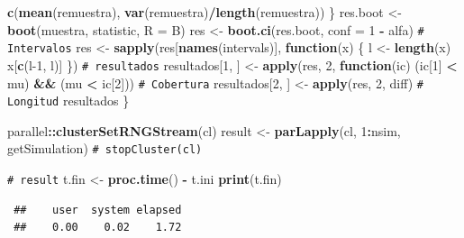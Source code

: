 \documentclass[
  spanish,
  10pt,
]{book}
\newenvironment{Shaded}{\begin{snugshade}}{\end{snugshade}}
\newcommand{\AttributeTok}[1]{\textcolor[rgb]{0.13,0.29,0.53}{#1}}
\newcommand{\CommentTok}[1]{\textcolor[rgb]{0.56,0.35,0.01}{\textit{#1}}}
\newcommand{\ControlFlowTok}[1]{\textcolor[rgb]{0.13,0.29,0.53}{\textbf{#1}}}
\newcommand{\DecValTok}[1]{\textcolor[rgb]{0.00,0.00,0.81}{#1}}
\newcommand{\FunctionTok}[1]{\textcolor[rgb]{0.13,0.29,0.53}{\textbf{#1}}}
\newcommand{\NormalTok}[1]{#1}
\newcommand{\OtherTok}[1]{\textcolor[rgb]{0.56,0.35,0.01}{#1}}
\newcommand{\SpecialCharTok}[1]{\textcolor[rgb]{0.81,0.36,0.00}{\textbf{#1}}}
\theoremstyle{break}
\theoremstyle{nonumberplain}
\renewcommand{\CommentTok}[1]{\textcolor[rgb]{0.41,0.41,0.41}{\texttt{#1}}}
\begin{document}
\begin{Shaded}
\begin{Highlighting}[]
      \FunctionTok{c}\NormalTok{(}\FunctionTok{mean}\NormalTok{(remuestra), }\FunctionTok{var}\NormalTok{(remuestra)}\SpecialCharTok{/}\FunctionTok{length}\NormalTok{(remuestra))}
\NormalTok{    \}}
\NormalTok{    res.boot }\OtherTok{\textless{}{-}} \FunctionTok{boot}\NormalTok{(muestra, statistic, }\AttributeTok{R =}\NormalTok{ B)}
\NormalTok{    res }\OtherTok{\textless{}{-}} \FunctionTok{boot.ci}\NormalTok{(res.boot, }\AttributeTok{conf =} \DecValTok{1} \SpecialCharTok{{-}}\NormalTok{ alfa)}
    \CommentTok{\# Intervalos}
\NormalTok{    res }\OtherTok{\textless{}{-}} \FunctionTok{sapply}\NormalTok{(res[}\FunctionTok{names}\NormalTok{(intervals)], }\ControlFlowTok{function}\NormalTok{(x) \{}
\NormalTok{      l }\OtherTok{\textless{}{-}} \FunctionTok{length}\NormalTok{(x)}
\NormalTok{      x[}\FunctionTok{c}\NormalTok{(l}\DecValTok{{-}1}\NormalTok{, l)]}
\NormalTok{    \})}
    \CommentTok{\# resultados}
\NormalTok{    resultados[}\DecValTok{1}\NormalTok{, ] }\OtherTok{\textless{}{-}} \FunctionTok{apply}\NormalTok{(res, }\DecValTok{2}\NormalTok{,}
                                   \ControlFlowTok{function}\NormalTok{(ic) (ic[}\DecValTok{1}\NormalTok{] }\SpecialCharTok{\textless{}}\NormalTok{ mu) }\SpecialCharTok{\&\&}\NormalTok{ (mu }\SpecialCharTok{\textless{}}\NormalTok{ ic[}\DecValTok{2}\NormalTok{])) }\CommentTok{\# Cobertura}
\NormalTok{    resultados[}\DecValTok{2}\NormalTok{, ] }\OtherTok{\textless{}{-}} \FunctionTok{apply}\NormalTok{(res, }\DecValTok{2}\NormalTok{, diff) }\CommentTok{\# Longitud}
\NormalTok{    resultados}
\NormalTok{\}}

\NormalTok{parallel}\SpecialCharTok{::}\FunctionTok{clusterSetRNGStream}\NormalTok{(cl)}
\NormalTok{result }\OtherTok{\textless{}{-}} \FunctionTok{parLapply}\NormalTok{(cl, }\DecValTok{1}\SpecialCharTok{:}\NormalTok{nsim, getSimulation)}
\CommentTok{\# stopCluster(cl)}

\CommentTok{\# result}
\NormalTok{t.fin }\OtherTok{\textless{}{-}} \FunctionTok{proc.time}\NormalTok{() }\SpecialCharTok{{-}}\NormalTok{ t.ini}
\FunctionTok{print}\NormalTok{(t.fin)}
\end{Highlighting}
\end{Shaded}

\begin{verbatim}
 ##    user  system elapsed 
 ##    0.00    0.02    1.72
\end{verbatim}
\end{document}
